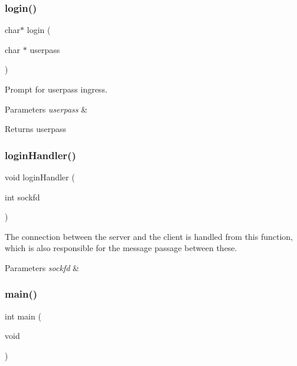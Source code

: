 \mbox{\label{cli_8c_a0d2a952bfee88348e1792d66acf01e38}} 
\subsubsection{login()}
{\footnotesize\ttfamily char$\ast$ login (\begin{DoxyParamCaption}\item[{char $\ast$}]{userpass }\end{DoxyParamCaption})}



Prompt for userpass ingress. 


\begin{DoxyParams}{Parameters}
{\em userpass} & \\
\hline
\end{DoxyParams}
\begin{DoxyReturn}{Returns}
userpass 
\end{DoxyReturn}
\mbox{\label{cli_8c_ab2275bb88b1cbbedf8613e11b147a91d}} 
\subsubsection{login\+Handler()}
{\footnotesize\ttfamily void login\+Handler (\begin{DoxyParamCaption}\item[{int}]{sockfd }\end{DoxyParamCaption})}



The connection between the server and the client is handled from this function, which is also responsible for the message passage between these. 


\begin{DoxyParams}{Parameters}
{\em sockfd} & \\
\hline
\end{DoxyParams}
\mbox{\label{cli_8c_ae66f6b31b5ad750f1fe042a706a4e3d4}} 
\subsubsection{main()}
{\footnotesize\ttfamily int main (\begin{DoxyParamCaption}\item[{void}]{ }\end{DoxyParamCaption})}

